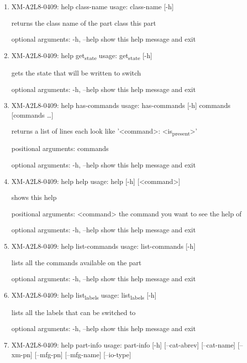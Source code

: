 \documentclass[11pt]{article}
\begin{document}
\begin{enumerate}
\item XM-A2L8-0409: help class-name
\label{sec:org196fda9}
usage: class-name [-h]

returns the class name of the part class this part

optional arguments:
  -h, --help  show this help message and exit

\item XM-A2L8-0409: help get\textsubscript{state}
\label{sec:org5f566ef}
usage: get\textsubscript{state} [-h]

gets the state that will be written to switch

optional arguments:
  -h, --help  show this help message and exit

\item XM-A2L8-0409: help has-commands
\label{sec:org91dfab4}
usage: has-commands [-h] commands [commands \ldots{}]

returns a list of lines each look like '<command>: <is\textsubscript{present}>'

positional arguments:
  commands

optional arguments:
  -h, --help  show this help message and exit

\item XM-A2L8-0409: help help
\label{sec:org11a4a9f}
usage: help [-h] [<command>]

shows this help

positional arguments:
  <command>   the command you want to see the help of

optional arguments:
  -h, --help  show this help message and exit

\item XM-A2L8-0409: help list-commands
\label{sec:orge7ac3c9}
usage: list-commands [-h]

lists all the commands available on the part

optional arguments:
  -h, --help  show this help message and exit

\item XM-A2L8-0409: help list\textsubscript{labels}
\label{sec:orgc054f27}
usage: list\textsubscript{labels} [-h]

lists all the labels that can be switched to

optional arguments:
  -h, --help  show this help message and exit

\item XM-A2L8-0409: help part-info
\label{sec:org571f323}
usage: part-info  [-h] [--cat-abrev] [--cat-name] [--xm-pn] [--mfg-pn] [--mfg-name]
        [--io-type]


\end{enumerate}
\end{document}

